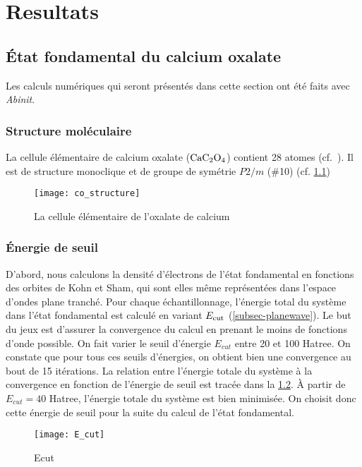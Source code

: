 \chapter{Resultats}
\label{chap-results}

\section{État fondamental du calcium oxalate}
Les calculs numériques qui seront présentés dans cette section ont été faits avec \textit{Abinit}.

\subsection{Structure moléculaire}
La cellule élémentaire de calcium oxalate ($\textnormal{Ca} \textnormal{C}_2 \textnormal{O}_4$) contient 28 atomes (cf.~\cite{Kolezynski2010}).
Il est de structure monoclique et de groupe de symétrie $P2/m$ ($\#$10) (cf. \cref{BrillouinZone})

\begin{figure}[!h]\label{BrillouinZone}
    \centering
    \texttt{[image: co\_structure]}
    \caption{La cellule élémentaire de l'oxalate de calcium}
\end{figure}
\subsection{Énergie de seuil}
D'abord, nous calculons la densité d'électrons de l'état fondamental
en fonctions des orbites de Kohn et Sham,
qui sont elles même représentées dans l'espace d'ondes plane tranché.
Pour chaque échantillonnage, l'énergie total du système dans l'état fondamental est calculé
en variant $E_{\textnormal{cut}}$ (\cref{subsec-planewave}).
Le but du jeux est d'assurer la convergence du calcul en prenant le moins de fonctions d'onde possible.
On fait varier le seuil d'énergie $E_{cut}$ entre 20 et 100 Hatree.
On constate que pour tous ces seuils d'énergies, on obtient bien une convergence au bout de 15 itérations.
La relation entre l'énergie totale du système à la convergence
en fonction de l'énergie de seuil est tracée dans la \cref{fig-Ecut}.
À partir de $E_{cut} = 40$ Hatree, l'énergie totale du système est bien minimisée.
On choisit donc cette énergie de seuil pour la suite du calcul de l'état fondamental.

\begin{figure}[!h]\label{fig-Ecut}
    \centering
    \texttt{[image: E\_cut]}
    \caption{Ecut}
\end{figure}

